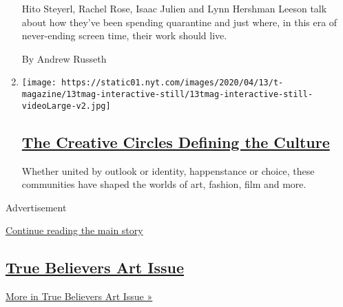 \begin{enumerate}
  Hito Steyerl, Rachel Rose, Isaac Julien and Lynn Hershman Leeson talk
  about how they've been spending quarantine and just where, in this era
  of never-ending screen time, their work should live.

  By Andrew Russeth
\item
  \texttt{[image: https://static01.nyt.com/images/2020/04/13/t-magazine/13tmag-interactive-still/13tmag-interactive-still-videoLarge-v2.jpg]}

  \hypertarget{the-creative-circles-defining-the-culture}{%
  \subsection{\texorpdfstring{\href{/interactive/2020/04/13/t-magazine/culture-issue-2020.html}{The
  Creative Circles Defining the
  Culture}}{The Creative Circles Defining the Culture}}\label{the-creative-circles-defining-the-culture}}

  Whether united by outlook or identity, happenstance or choice, these
  communities have shaped the worlds of art, fashion, film and more.
\end{enumerate}

Advertisement

\protect\hyperlink{after-mid1}{Continue reading the main story}

\hypertarget{true-believers-art-issue}{%
\subsection{\texorpdfstring{\href{/issue/t-magazine/2020/07/02/true-believers-art-issue}{True
Believers Art
Issue}}{True Believers Art Issue}}\label{true-believers-art-issue}}

\href{/issue/t-magazine/2020/07/02/true-believers-art-issue}{More in
True Believers Art Issue »}

